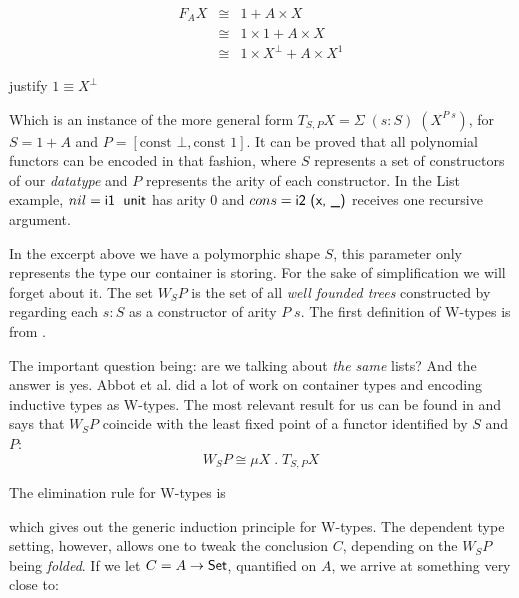 \begin{eqnarray*}
  F_A X & \cong & 1 + A \times X \\
        & \cong & 1 \times 1 + A \times X \\
        & \cong & 1 \times X^\bot + A \times X^1
\end{eqnarray*}

\begin{TODO}
  \item justify $1 \equiv X^\bot$
\end{TODO}

Which is an instance of the more general form $T_{S, P} X = \Sigma\; (s : S)\; (X^{P\; s})$, for
$S = 1 + A$ and $P = [ \text{const }\bot , \text{const }1 ]$. It can be proved
that all polynomial functors can be encoded in that fashion\cite{Abbott04}, where $S$ represents
a set of constructors of our \emph{datatype} and $P$ represents the arity of each constructor.
In the List example, $nil = \IC{i1\; unit}$ has arity 0 and $cons = \IC{i2 (x, \_)}$ receives
one recursive argument.


In the excerpt above we have a polymorphic shape $S$, this parameter
only represents the type our container is storing. For the sake of simplification we will forget about it.
The set $W_S P$ is the set of all \emph{well founded trees} constructed by regarding each $s : S$ 
as a constructor of arity $P\; s$. The first definition of W-types is from \cite{lof84}.


The important question being: are we talking about \emph{the same} lists? And the answer 
is yes. Abbot et al. did a lot of work on container types
and encoding inductive types as W-types. The most relevant result for us can be found in \cite{Abbott04} and
says that $W_S P$ coincide with the least fixed point of a functor identified by $S$ and $P$:
\[
  W_S P \cong \mu X\; . \;T_{S , P} X
\]

The elimination rule for W-types is


which gives out the generic induction principle for W-types. The dependent type setting, however, allows
one to tweak the conclusion $C$, depending on the $W_S P$ being \emph{folded}. If we let
$C = A \rightarrow \D{Set}$, quantified on $A$, we arrive at something very close to:


